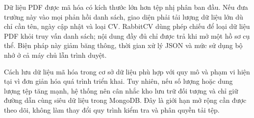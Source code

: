 Dữ liệu PDF được mã hóa có kích thước lớn hơn tệp nhị phân ban đầu. Nếu đưa trường này vào mọi phản hồi danh sách, giao diện phải tải lượng dữ liệu lớn dù chỉ cần tên, ngày cập nhật và loại CV. RabbitCV dùng phép chiếu để loại dữ liệu PDF khỏi truy vấn danh sách; nội dung đầy đủ chỉ được trả khi mở một hồ sơ cụ thể. Biện pháp này giảm băng thông, thời gian xử lý JSON và mức sử dụng bộ nhớ ở cả máy chủ lẫn trình duyệt.

Cách lưu dữ liệu mã hóa trong cơ sở dữ liệu phù hợp với quy mô và phạm vi hiện tại vì đơn giản hóa quá trình triển khai. Tuy nhiên, nếu số lượng hoặc dung lượng tệp tăng mạnh, hệ thống nên cân nhắc kho lưu trữ đối tượng và chỉ giữ đường dẫn cùng siêu dữ liệu trong MongoDB. Đây là giới hạn mở rộng cần được theo dõi, không làm thay đổi quy trình kiểm tra và phân quyền tải tệp.






